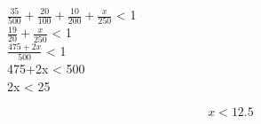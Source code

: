 \begin{question}
        
    $\frac{35}{500} + \frac{20}{100} + \frac{10}{200} + \frac{x}{250}$ < 1 \\

    $\frac{19}{20} + \frac{x}{250}$ < 1 \\

    $\frac{475+2x}{500}$ < 1 \\

    475+2x < 500 \\

    2x < 25 

    \begin{equation*}
        x < 12.5
    \end{equation*}

\end{question}
